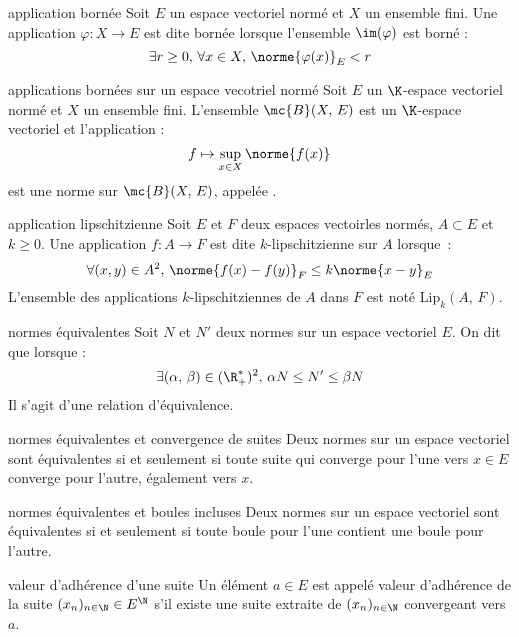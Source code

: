 \begin{adjustwidth}{-3cm}{-3cm}
\begin{definition}{3.19}{application bornée}
    Soit $E$ un espace vectoriel normé et $X$ un ensemble fini. Une application $\varphi : X \to E$ est dite bornée lorsque l'ensemble $\im(\varphi)    $ est borné : 
    $$\exists r \geq 0,\, \forall x \in X,\, \norme{\varphi(x)}_E < r$$
\end{definition}

\begin{definition}{3.20}{applications bornées sur un espace vecotriel normé}
    Soit $E$ un $\K$-espace vectoriel normé et $X$ un ensemble fini. L'ensemble $\mc{B}(X,\,E)$ est un $\K$-espace vectoriel et l'application : 
    $$f \mapsto \sup_{x \in X}\norme{f(x)}$$
    est une norme sur $\mc{B}(X,\,E)$, appelée .
\end{definition}

\begin{definition}{3.21}{application lipschitzienne}
    Soit $E$ et $F$ deux espaces vectoirles normés, $A \subset E$ et $k \geq 0$. Une application $f : A \to F$ est dite $k$-lipschitzienne sur $A$ lorsque~:
    $$\forall (x,y) \in A^2,\, \norme{f(x) -  f(y)}_F \leq k\norme{x-y}_E$$
    L'ensemble des applications $k$-lipschitziennes de $A$ dans $F$ est noté $\text{Lip}_k(A,\, F)$.
\end{definition}

\begin{definition}{3.30}{normes équivalentes} 
    Soit $N$ et $N'$ deux normes sur un espace vectoriel $E$. On dit que  lorsque :
    $$\exists(\alpha,\, \beta) \in (\R_+^*)^2,\, \alpha N \leq N' \leq \beta N$$
    Il s'agit d'une relation d'équivalence.
\end{definition}

\begin{proposition}{3.31}{normes équivalentes et convergence de suites}
    Deux normes sur un espace vectoriel sont équivalentes si et seulement si toute suite qui converge pour l'une vers $x \in E$ converge pour l'autre, également vers $x$.
\end{proposition}

\begin{proposition}{3.32}{normes équivalentes et boules incluses}
    Deux normes sur un espace vectoriel sont équivalentes si et seulement si toute boule pour l'une contient une boule pour l'autre.
\end{proposition}

\begin{definition}{3.37}{valeur d'adhérence d'une suite}
    Un élément $a \in E$ est appelé valeur d'adhérence de la suite $(x_n)_{n \in \N} \in E^\N$ s'il existe une suite extraite de $(x_n)_{n \in \N}$ convergeant vers $a$.
\end{definition}


\end{adjustwidth}
